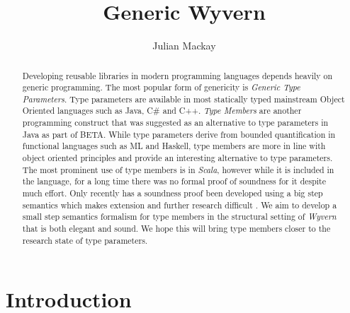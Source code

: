 \documentclass[11pt
              , a4paper
              , twoside
              , openright
              ]{report}
\title{Generic Wyvern}
\author{Julian Mackay}
\date{}
\numberwithin{case}{theorem}
\numberwithin{subcase}{case}
\begin{document}
\frontmatter



\begin{abstract}
Developing reusable libraries in modern programming languages depends heavily on generic programming. The most popular form of genericity is \emph{Generic Type Parameters}. Type parameters are available in most statically typed mainstream Object Oriented languages such as Java, C\# and C++. \emph{Type Members} are another programming construct that was suggested as an alternative to type parameters in Java as part of BETA. While type parameters derive from bounded quantification in functional languages such as ML and Haskell, type members are more in line with object oriented principles and provide an interesting alternative to type parameters. The most prominent use of type members is in \emph{Scala}, however while it is included in the language, for a long time there was no formal proof of soundness for it despite much effort. Only recently has a soundness proof been developed using a big step semantics which makes extension and further research difficult . We aim to develop a small step semantics formalism for type members in the structural setting of \emph{Wyvern} that is both elegant and sound. We hope this will bring type members closer to the research state of type parameters. 
\end{abstract}


\maketitle



\tableofcontents



\mainmatter



\chapter{Introduction}\label{ch:intro}
\end{document}
